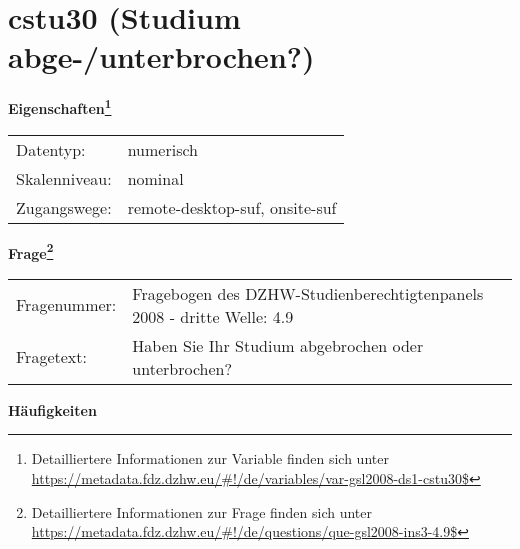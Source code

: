 
    \setcounter{footnote}{0}

    \vspace*{-1.8cm}
	\section{cstu30 (Studium abge-/unterbrochen?)}
	\label{section:cstu30}



    \vspace*{0.5cm}
    \noindent\textbf{Eigenschaften\footnote{Detailliertere Informationen zur Variable finden sich unter
		\url{https://metadata.fdz.dzhw.eu/\#!/de/variables/var-gsl2008-ds1-cstu30$}}}\\
	\begin{tabularx}{\hsize}{@{}lX}
	Datentyp: & numerisch \\
	Skalenniveau: & nominal \\
	Zugangswege: &
	  remote-desktop-suf, 
	  onsite-suf
 \\
    \end{tabularx}



				\vspace*{0.5cm}
                \noindent\textbf{Frage\footnote{Detailliertere Informationen zur Frage finden sich unter
		              \url{https://metadata.fdz.dzhw.eu/\#!/de/questions/que-gsl2008-ins3-4.9$}}}\\
				\begin{tabularx}{\hsize}{@{}lX}
					Fragenummer: &
					  Fragebogen des DZHW-Studienberechtigtenpanels 2008 - dritte Welle:
					  4.9
 \\
					Fragetext: & Haben Sie Ihr Studium abgebrochen oder unterbrochen? \\
				\end{tabularx}





        		\vspace*{0.5cm}
                \noindent\textbf{Häufigkeiten}

